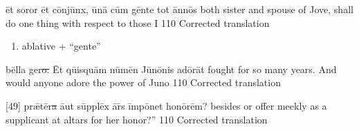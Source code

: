 \latline
  {\=et s\-or\-or \=et c\=onj\={\macron u}nx, \={\macron u}n\={\macron a} c\=um g\=ent\-e t\-ot \=ann\={\macron o}s}
  {both sister and spouse of Jove, shall do one thing with respect to those I }
  {110} %
  {Corrected translation}
  {
	\begin{enumerate}
		\item ablative + ``gente''
	\end{enumerate}
  }

\latline
  {b\=ell\-a g\-er\sout{o.  }\=Et q\={ui}squ\=am n\={\macron u}m\=en J\={\macron u}n\={\macron o}n\-is \-ad\={\macron o}r\=at}
  {fought for so many years.  And would anyone adore the power of Juno}
  {110} %
  {Corrected translation}
  {
  }

\latline
  {[49] pr\={\ae}t\=er\sout{\macron a }\={au}t s\=uppl\=ex \={\macron a}r\={\macron{\i}}s \=imp\={\macron o}n\-et h\-on\={\macron o}r\=em?}
  {besides or offer meekly as a supplicant at altars for her honor?''}
  {110} %
  {Corrected translation}
  {
  }


